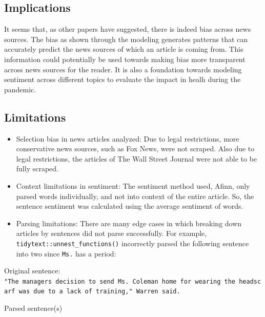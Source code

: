 \documentclass[
]{article}
\begin{document}
\hypertarget{implications}{%
\subsection{Implications}\label{implications}}

It seems that, as other papers have suggested, there is indeed bias
across news sources. The bias as shown through the modeling generates
patterns that can accurately predict the news sources of which an
article is coming from. This information could potentially be used
towards making bias more transparent across news sources for the reader.
It is also a foundation towards modeling sentiment across different
topics to evaluate the impact in healh during the pandemic.

\hypertarget{limitations}{%
\subsection{Limitations}\label{limitations}}

\begin{itemize}
\item
  Selection bias in news articles analyzed: Due to legal restrictions,
  more conservative news sources, such as Fox News, were not scraped.
  Also due to legal restrictions, the articles of The Wall Street
  Journal were not able to be fully scraped.
\item
  Context limitations in sentiment: The sentiment method used, Afinn,
  only parsed words individually, and not into context of the entire
  article. So, the sentence sentiment was calculated using the average
  sentiment of words.
\item
  Parsing limitations: There are many edge cases in which breaking down
  articles by sentences did not parse successfully. For example,
  \texttt{tidytext::unnest\_functions()} incorrectly parsed the
  following sentence into two since \texttt{Ms.} has a period:
\end{itemize}

Original sentence:
\texttt{"The\ manager\textquotesingle{}s\ decision\ to\ send\ Ms.\ Coleman\ home\ for\ wearing\ the\ headscarf\ was\ due\ to\ a\ lack\ of\ training,"\ Warren\ said.}

Parsed sentence(s)
\end{document}
